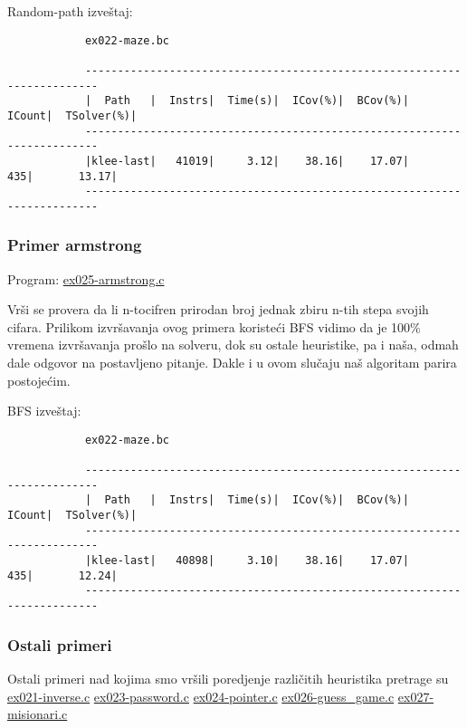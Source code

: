 \documentclass[a4paper]{article}
\begin{document}
{		Random-path izveštaj:
		
		\begin{verbatim}
			ex022-maze.bc
			
			------------------------------------------------------------------------
			|  Path   |  Instrs|  Time(s)|  ICov(%)|  BCov(%)|  ICount|  TSolver(%)|
			------------------------------------------------------------------------
			|klee-last|   41019|     3.12|    38.16|    17.07|     435|       13.17|
			------------------------------------------------------------------------
		\end{verbatim}
		
	\subsubsection{Primer armstrong}
		
		Program: \href{file:primeri/ex025-armstrong.c}{ex025-armstrong.c}
		
		Vrši se provera da li n-tocifren prirodan broj jednak zbiru n-tih stepa svojih cifara. Prilikom izvršavanja ovog primera koristeći BFS vidimo da je 100\% vremena izvršavanja prošlo na solveru, dok su ostale heuristike, pa i naša, odmah dale odgovor na postavljeno pitanje. Dakle i u ovom slučaju naš algoritam parira postojećim.
		
		BFS izveštaj:
		
		\begin{verbatim}
			ex022-maze.bc
			
			------------------------------------------------------------------------
			|  Path   |  Instrs|  Time(s)|  ICov(%)|  BCov(%)|  ICount|  TSolver(%)|
			------------------------------------------------------------------------
			|klee-last|   40898|     3.10|    38.16|    17.07|     435|       12.24|
			------------------------------------------------------------------------
		\end{verbatim}
		
		
	\subsubsection{Ostali primeri}
		
		Ostali primeri nad kojima smo vršili poredjenje različitih heuristika pretrage su \href{file:primeri/ex021-inverse.c}{ex021-inverse.c}
		\href{file:primeri/ex023-password.c}{ex023-password.c}
		\href{file:primeri/ex024-pointer.c}{ex024-pointer.c}
		\href{file:primeri/ex026-guess_game.c}{ex026-guess\_game.c}
		\href{file:primeri/ex027-misionari.c}{ex027-misionari.c}
		
}
\end{document}
